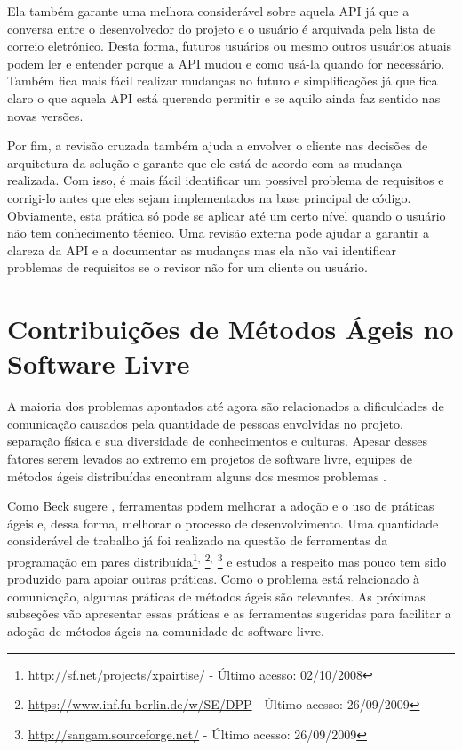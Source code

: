 Ela também garante uma melhora considerável sobre aquela API já que a
conversa entre o desenvolvedor do projeto e o usuário é arquivada pela
lista de correio eletrônico. Desta forma, futuros usuários ou mesmo
outros usuários atuais podem ler e entender porque a API mudou e como
usá-la quando for necessário. Também fica mais fácil realizar mudanças
no futuro e simplificações já que fica claro o que aquela API está
querendo permitir e se aquilo ainda faz sentido nas novas versões.

Por fim, a revisão cruzada também ajuda a envolver o cliente nas
decisões de arquitetura da solução e garante que ele está de acordo
com as mudança realizada. Com isso, é mais fácil identificar um
possível problema de requisitos e corrigi-lo antes que eles sejam
implementados na base principal de código. Obviamente, esta prática só
pode se aplicar até um certo nível quando o usuário não tem
conhecimento técnico. Uma revisão externa pode ajudar a garantir a
clareza da API e a documentar as mudanças mas ela não vai identificar
problemas de requisitos se o revisor não for um cliente ou usuário.

\section{Contribuições de Métodos Ágeis no Software Livre}
\label{sec:agile-improve-os}

A maioria dos problemas apontados até agora são relacionados a
dificuldades de comunicação causados pela quantidade de pessoas
envolvidas no projeto, separação física e sua diversidade de
conhecimentos e culturas. Apesar desses fatores serem levados ao
extremo em projetos de software livre, equipes de métodos ágeis
distribuídas encontram alguns dos mesmos problemas
\cite{Sutherland2007,Maurer2002}.

Como Beck sugere \cite{Beck2008}, ferramentas podem melhorar a adoção
e o uso de práticas ágeis e, dessa forma, melhorar o processo de
desenvolvimento. Uma quantidade considerável de trabalho já foi
realizado na questão de ferramentas da programação em pares
distribuída\footnote{\url{http://sf.net/projects/xpairtise/} - Último
  acesso: 02/10/2008}$^{,}$
\footnote{\url{https://www.inf.fu-berlin.de/w/SE/DPP} - Último acesso:
  26/09/2009}$^{,}$ \footnote{\url{http://sangam.sourceforge.net/} -
  Último acesso: 26/09/2009} e estudos a respeito \cite{Nagappan2003}
mas pouco tem sido produzido para apoiar outras práticas. Como o
problema está relacionado à comunicação, algumas práticas de métodos
ágeis são relevantes. As próximas subseções vão apresentar essas
práticas e as ferramentas sugeridas para facilitar a adoção de métodos
ágeis na comunidade de software livre.

